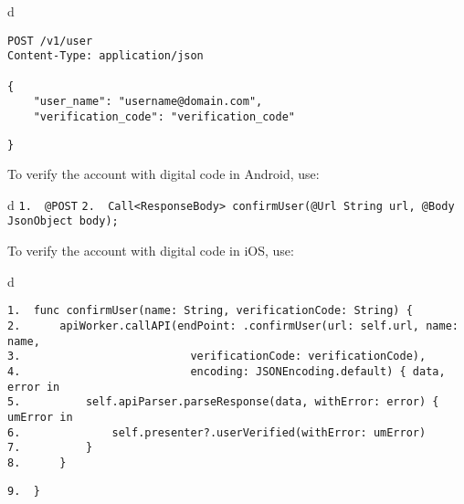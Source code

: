 \documentclass[a4paper,12pt]{book}
\begin{document}
\begin{codebloc}
\begin{tabular}{d}
\vspace{2pt}
\begin{verbatim}
POST /v1/user
Content-Type: application/json

{
    "user_name": "username@domain.com",
    "verification_code": "verification_code"
\end{verbatim}
\verb|}|
\end{tabular}
\end{codebloc}

To verify the account with digital code in Android, use:

\begin{codebloc}
\begin{tabular}{d}
\verb|1.  @POST|\newline
\verb|2.  Call<ResponseBody> confirmUser(@Url String url, @Body JsonObject body);|
\end{tabular}
\end{codebloc}


To verify the account with digital code in iOS, use:

\begin{codebloc}
\begin{tabular}{d}
\vspace{2pt}
\begin{verbatim}
1.  func confirmUser(name: String, verificationCode: String) {
2.      apiWorker.callAPI(endPoint: .confirmUser(url: self.url, name: name,
3.                          verificationCode: verificationCode),
4.                          encoding: JSONEncoding.default) { data, error in
5.          self.apiParser.parseResponse(data, withError: error) { umError in
6.              self.presenter?.userVerified(withError: umError)
7.          }
8.      }
\end{verbatim}
\verb|9.  }|
\end{tabular}
\end{codebloc}
\end{document}
